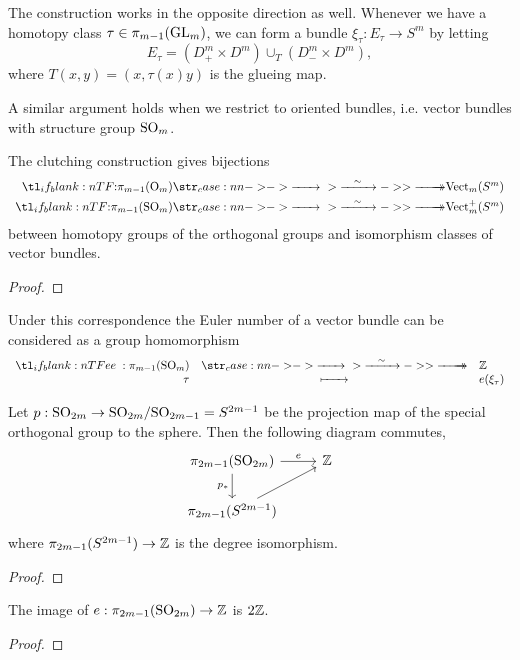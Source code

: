 The construction works in the opposite direction as well. Whenever we have a homotopy class $\tau\in \pi_{m-1}({\operatorname{GL}}_m)$, we can form a bundle $\xi_\tau : E_\tau \to S^{m}$ by letting
\[
	E_\tau = (D_+^m\times D^m)\cup_T (D_-^{m}\times D^m),
\]
where $T(x,y)=(x,\tau(x)y)$ is the glueing map.


A similar argument holds when we restrict to oriented bundles, i.e. vector bundles with structure group ${\operatorname{SO}}_m$.

\begin{theorem}
	The clutching construction gives bijections
	\[
		\begin{aligned}
			\lkxfunc{}{\pi_{m-1}(\O_m)}{\op{Vect}_m(S^m)} \\
			\lkxfunc{}{\pi_{m-1}(\SO_m)}{\op{Vect}_m^+(S^m)}
		\end{aligned}
	\]
	between homotopy groups of the orthogonal groups and isomorphism classes of vector bundles.
\end{theorem}
\begin{proof}
\end{proof}

Under this correspondence the Euler number of a vector bundle can be considered as a group homomorphism
\[
	\lkxfunc{e}{\pi_{m-1}(\SO_m)}{\Z}{\tau}{e(\xi_\tau)}
\]
\begin{theorem}\label{thm:euler-number-of-vector-bundle-over-sphere}
	Let $p : {\operatorname{SO}}_{2m} \to {\operatorname{SO}}_{2m}/{\operatorname{SO}}_{2m-1}= S^{2m-1}$ be the projection map of the special orthogonal group to the sphere. Then the following diagram commutes,
	\[\begin{tikzcd}
			{\pi_{2m-1}(\SO_{2m})} & \Z \\
			{\pi_{2m-1}(S^{2m-1})}
			\arrow["e", from=1-1, to=1-2]
			\arrow["{p_*}"', from=1-1, to=2-1]
			\arrow[from=2-1, to=1-2]
		\end{tikzcd}\]
	where $\pi_{2m-1}(S^{2m-1})\to \mathbb{Z}$ is the degree isomorphism.
\end{theorem}
\begin{proof}
\end{proof}

\begin{corollary}
	The image of $e : \pi_{2m-1}({\operatorname{SO}}_{2m})\to\mathbb{Z}$ is $2\mathbb{Z}$.
\end{corollary}
\begin{proof}
\end{proof}


